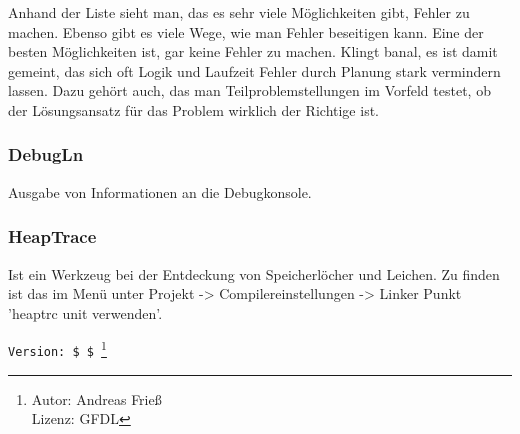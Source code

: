 Anhand der Liste sieht man, das es sehr viele Möglichkeiten gibt, Fehler zu machen. Ebenso gibt es viele Wege, wie man Fehler beseitigen kann. Eine der besten Möglichkeiten ist, gar keine Fehler zu machen. Klingt banal, es ist damit gemeint, das sich oft Logik und Laufzeit Fehler durch Planung stark vermindern lassen. Dazu gehört auch, das man Teilproblemstellungen im Vorfeld testet, ob der Lösungsansatz für das Problem wirklich der Richtige ist.

\subsubsection[DebugLn]{DebugLn}
Ausgabe von Informationen an die Debugkonsole.

\subsubsection[Heap Trace]{HeapTrace}
Ist ein Werkzeug bei der Entdeckung von Speicherlöcher und Leichen. Zu finden ist das im Menü unter Projekt -> Compilereinstellungen -> Linker Punkt 'heaptrc unit verwenden'.

%
%
%
%
%	
%
%
%
%
%

%	

\verb|Version: $ $ |\footnote{ Autor: Andreas Frieß\\Lizenz: GFDL}

